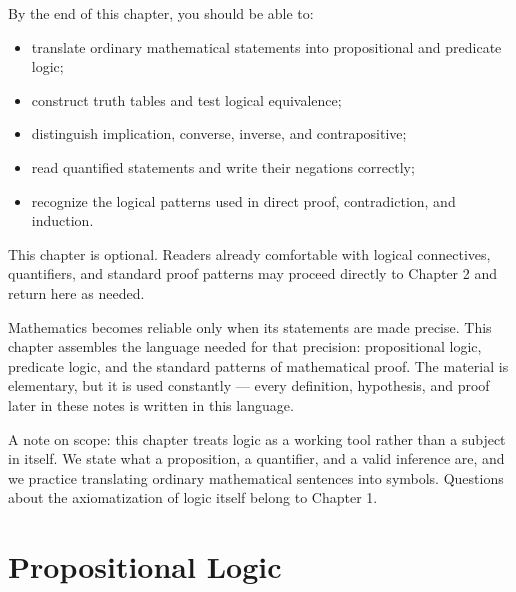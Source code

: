 \chapterzero

\begin{learningobjectives}
By the end of this chapter, you should be able to:
\begin{itemize}
    \item translate ordinary mathematical statements into propositional and predicate logic;
    \item construct truth tables and test logical equivalence;
    \item distinguish implication, converse, inverse, and contrapositive;
    \item read quantified statements and write their negations correctly;
    \item recognize the logical patterns used in direct proof, contradiction, and induction.
\end{itemize}
\end{learningobjectives}

\begin{mynote}
This chapter is optional. Readers already comfortable with logical connectives, quantifiers, and standard proof patterns may proceed directly to Chapter 2 and return here as needed.
\end{mynote}

Mathematics becomes reliable only when its statements are made precise. This chapter assembles the language needed for that precision: propositional logic, predicate logic, and the standard patterns of mathematical proof. The material is elementary, but it is used constantly — every definition, hypothesis, and proof later in these notes is written in this language.

A note on scope: this chapter treats logic as a working tool rather than a subject in itself. We state what a proposition, a quantifier, and a valid inference are, and we practice translating ordinary mathematical sentences into symbols. Questions about the axiomatization of logic itself belong to Chapter 1.

\section{Propositional Logic}

